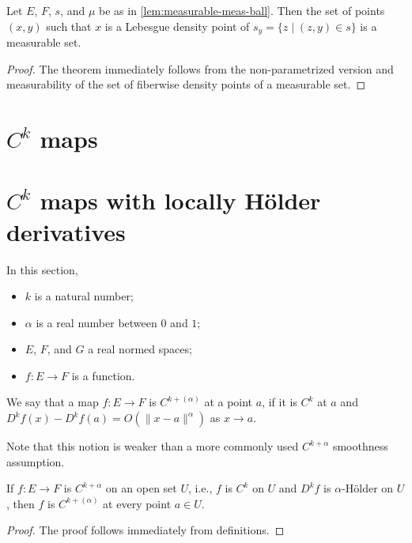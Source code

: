 \begin{corollary}%
  \label{cor:measurable-density}
  \leanok%
  Let \(E\), \(F\), \(s\), and \(\mu\) be as in \autoref{lem:measurable-meas-ball}.
  Then the set of points \((x, y)\) such that \(x\) is a Lebesgue density point of \(s_{y} = \{z \mid (z, y) \in s\}\)
  is a measurable set.
\end{corollary}
\begin{proof}
  \leanok%
  The theorem immediately follows from the non-parametrized version
  and measurability of the set of fiberwise density points of a measurable set.
\end{proof}

\section{\(C^k\) maps}%
\label{sec:ck-maps}

\section{\(C^{k}\) maps with locally Hölder derivatives}

In this section,
\begin{itemize}
\item \(k\) is a natural number;
\item \(\alpha\) is a real number between \(0\) and \(1\);
\item \(E\), \(F\), and \(G\) a real normed spaces;
\item \(f\colon E \to F\) is a function.
\end{itemize}

\begin{definition}%
  \label{def:cdh-at}
  We say that a map \(f\colon E\to F\) is \emph{\(C^{k+(\alpha)}\)} at a point \(a\),
  if it is \(C^{k}\) at \(a\) and \(D^{k}f(x) - D^{k}f(a) = O(\|x - a\|^{\alpha})\) as \(x\to a\).
\end{definition}

Note that this notion is weaker than a more commonly used \(C^{k+\alpha}\) smoothness assumption.
\begin{lemma}%
  \label{def:contdiffholder-imp-cdh-at}
  If \(f\colon E \to F\) is \(C^{k+\alpha}\) on an open set \(U\),
  i.e., \(f\) is \(C^{k}\) on \(U\) and \(D^{k}f\) is \(\alpha\)-Hölder on \(U\),
  then \(f\) is \(C^{k+(\alpha)}\) at every point \(a \in U\).
\end{lemma}
\begin{proof}
  The proof follows immediately from definitions.
\end{proof}


